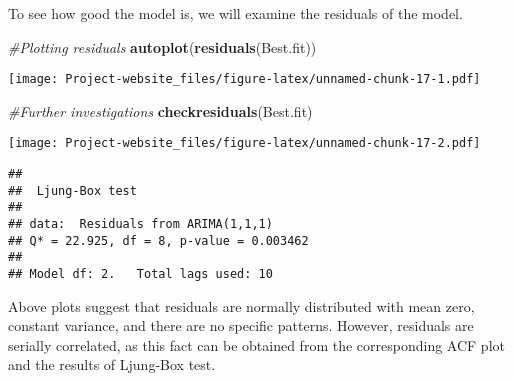 \documentclass[]{article}
\newenvironment{Shaded}{\begin{snugshade}}{\end{snugshade}}
\newcommand{\KeywordTok}[1]{\textcolor[rgb]{0.13,0.29,0.53}{\textbf{#1}}}
\newcommand{\CommentTok}[1]{\textcolor[rgb]{0.56,0.35,0.01}{\textit{#1}}}
\newcommand{\NormalTok}[1]{#1}
\begin{document}
To see how good the model is, we will examine the residuals of the
model.

\begin{Shaded}
\begin{Highlighting}[]
\CommentTok{#Plotting residuals}
\KeywordTok{autoplot}\NormalTok{(}\KeywordTok{residuals}\NormalTok{(Best.fit))}
\end{Highlighting}
\end{Shaded}

\texttt{[image: Project-website\_files/figure-latex/unnamed-chunk-17-1.pdf]}

\begin{Shaded}
\begin{Highlighting}[]
\CommentTok{#Further investigations}
\KeywordTok{checkresiduals}\NormalTok{(Best.fit)}
\end{Highlighting}
\end{Shaded}

\texttt{[image: Project-website\_files/figure-latex/unnamed-chunk-17-2.pdf]}

\begin{verbatim}
## 
##  Ljung-Box test
## 
## data:  Residuals from ARIMA(1,1,1)
## Q* = 22.925, df = 8, p-value = 0.003462
## 
## Model df: 2.   Total lags used: 10
\end{verbatim}

Above plots suggest that residuals are normally distributed with mean
zero, constant variance, and there are no specific patterns. However,
residuals are serially correlated, as this fact can be obtained from the
corresponding ACF plot and the results of Ljung-Box test.
\end{document}
